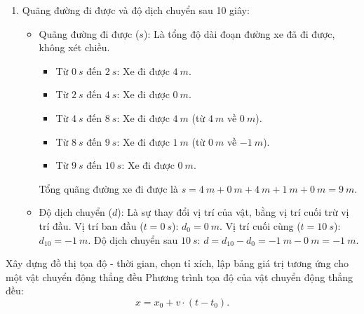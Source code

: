 \begin{vd}
{\begin{enumerate}[label=\alph*)]
			\item Quãng đường đi được và độ dịch chuyển sau 10 giây:
			\begin{itemize}
				\item Quãng đường đi được ($s$): Là tổng độ dài đoạn đường xe đã đi được, không xét chiều.
				\begin{itemize}
					\item Từ $\SI{0}{s}$ đến $\SI{2}{s}$: Xe đi được $\SI{4}{m}$.
					\item Từ $\SI{2}{s}$ đến $\SI{4}{s}$: Xe đi được $\SI{0}{m}$.
					\item Từ $\SI{4}{s}$ đến $\SI{8}{s}$: Xe đi được $\SI{4}{m}$ (từ $\SI{4}{m}$ về $\SI{0}{m}$).
					\item Từ $\SI{8}{s}$ đến $\SI{9}{s}$: Xe đi được $\SI{1}{m}$ (từ $\SI{0}{m}$ về $\SI{-1}{m}$).
					\item Từ $\SI{9}{s}$ đến $\SI{10}{s}$: Xe đi được $\SI{0}{m}$.
				\end{itemize}
				Tổng quãng đường xe đi được là $s = \SI{4}{m} + \SI{0}{m} + \SI{4}{m} + \SI{1}{m} + \SI{0}{m} = \SI{9}{m}.$
				
				\item Độ dịch chuyển ($d$): Là sự thay đổi vị trí của vật, bằng vị trí cuối trừ vị trí đầu.
				Vị trí ban đầu ($t=\SI{0}{s}$): $d_0 = \SI{0}{m}$.
				Vị trí cuối cùng ($t=\SI{10}{s}$): $d_{10} = \SI{-1}{m}$.
				Độ dịch chuyển sau $\SI{10}{s}$: $d = d_{10} - d_0 = \SI{-1}{m} - \SI{0}{m} = \SI{-1}{m}.$
			\end{itemize}
		\end{enumerate}}
	\end{vd}
\begin{dang}{Xây dựng đồ thị tọa độ - thời gian, chọn tỉ xích, lập bảng giá trị tương ứng cho một vật chuyển động thẳng đều}
	Phương trình tọa độ của vật chuyển động thẳng đều:
	$$x=x_0+v\cdot \left(t-t_0\right).$$
\end{dang}
